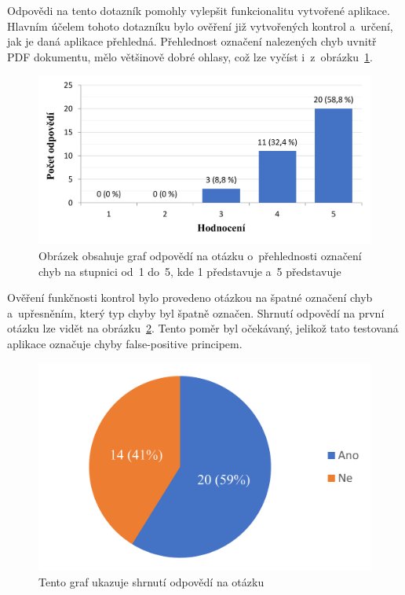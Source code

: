 Odpovědi na tento dotazník pomohly vylepšit funkcionalitu vytvořené aplikace.
Hlavním účelem tohoto dotazníku bylo ověření již vytvořených kontrol a~určení,
jak je daná aplikace přehledná. Přehlednost označení nalezených chyb
uvnitř PDF dokumentu, mělo většinově dobré ohlasy, což lze
vyčíst i~z~obrázku~\ref{rate_checks}.

\begin{figure}[H]
    \centering
    \includegraphics[width=0.8\linewidth]{obrazky-figures/graph1.pdf}
    \caption{
        Obrázek obsahuje graf odpovědí
        na otázku o~přehlednosti označení chyb na stupnici od~1 do~5, kde 
        1 představuje 
        a~5 představuje 
    }
    \label{rate_checks}
\end{figure}

Ověření funkčnosti kontrol bylo provedeno otázkou na špatné označení chyb
a~upřesněním, který typ chyby byl špatně označen. Shrnutí odpovědí na
první otázku lze vidět na obrázku~\ref{pic_graph_false_mistakes}.
Tento poměr byl očekávaný, jelikož tato testovaná aplikace označuje chyby
false-positive principem.

\begin{figure}[H]
    \centering
    \includegraphics[width=0.6\linewidth]{obrazky-figures/graph_false_mistakes.pdf}
    \caption{
        Tento graf ukazuje shrnutí odpovědí na otázku 
    }
    \label{pic_graph_false_mistakes}
\end{figure}

